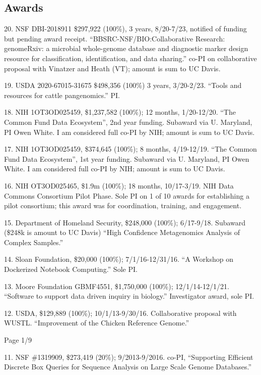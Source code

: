 \documentclass[margin,line]{resume}
\begin{document}
\begin{resume}
\section{\mysidestyle Awards}

20. NSF DBI-2018911 \$297,922 (100\%), 3 years, 8/20-7/23, notified of funding but pending award receipt. ``BBSRC-NSF/BIO:Collaborative Research: genomeRxiv: a microbial whole-genome database and diagnostic marker design resource for classification, identification, and data sharing.'' co-PI on collaborative proposal with Vinatzer and Heath (VT); amount is sum to UC Davis.

19. USDA 2020-67015-31675 \$498,356 (100\%) 3 years, 3/20-2/23. ``Tools and resources for cattle pangenomics.'' PI.

18. NIH 1OT3OD025459, \$1,237,582 (100\%); 12 months, 1/20-12/20. ``The Common Fund Data Ecosystem'', 2nd year funding. Subaward via U. Maryland, PI Owen White. I am considered full co-PI by NIH; amount is sum to UC Davis.

17. NIH 1OT3OD025459, \$374,645 (100\%); 8 months, 4/19-12/19. ``The Common Fund Data Ecosystem'', 1st year funding. Subaward via U. Maryland, PI Owen White. I am considered full co-PI by NIH; amount is sum to UC Davis.

16. NIH OT3OD025465, \$1.9m (100\%); 18 months, 10/17-3/19. NIH Data Commons Consortium Pilot Phase. Sole PI on 1 of 10 awards for establishing a pilot consortium; this award was for coordination, training, and engagement.

15. Department of Homeland Security, \$248,000 (100\%); 6/17-9/18. Subaward (\$248k is amount to UC Davis) ``High Confidence Metagenomics Analysis of Complex Samples.''

14. Sloan Foundation, \$20,000 (100\%); 7/1/16-12/31/16. ``A Workshop on Dockerized Notebook Computing.'' Sole PI.

13. Moore Foundation GBMF4551, \$1,750,000 (100\%); 12/1/14-12/1/21.  ``Software to support data driven inquiry in biology.'' Investigator award, sole PI.

12. USDA, \$129,889 (100\%); 10/1/13-9/30/16.  Collaborative proposal with WUSTL. ``Improvement of the Chicken Reference Genome.''

{\centerline {Page 1/9}}

\newpage

11. NSF \#1319909, \$273,419 (20\%); 9/2013-9/2016. co-PI, ``Supporting Efficient Discrete Box Queries for Sequence Analysis on Large Scale Genome Databases.''


\end{resume}
\end{document}
